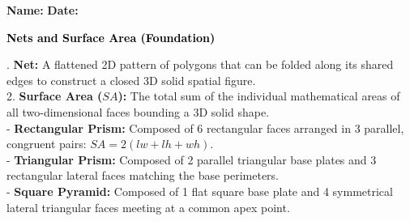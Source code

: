 \documentclass[12pt, letterpaper, fleqn]{article}
\renewcommand{\footrulewidth}{0.2pt}
\begin{document}
\pagestyle{fancy}
\fancyhf{}
\fancyfoot[C]{\thepage}
\renewcommand{\footrulewidth}{0.2pt}

\textbf{Name:} \underline{\hspace{5cm}} \hfill \textbf{Date:} \underline{\hspace{3cm}}\\

\begin{tcolorbox}[colback=black!10]
    \large\textcolor{black}{\textbf{Nets and Surface Area (Foundation)}}
\end{tcolorbox}

\vspace{2mm}
. \textbf{Net:} A flattened 2D pattern of polygons that can be folded along its shared edges to construct a closed 3D solid spatial figure.\\
2. \textbf{Surface Area ($SA$):} The total sum of the individual mathematical areas of all two-dimensional faces bounding a 3D solid shape.\\
- \textbf{Rectangular Prism:} Composed of 6 rectangular faces arranged in 3 parallel, congruent pairs: $SA = 2(lw + lh + wh)$.\\
- \textbf{Triangular Prism:} Composed of 2 parallel triangular base plates and 3 rectangular lateral faces matching the base perimeters.\\
- \textbf{Square Pyramid:} Composed of 1 flat square base plate and 4 symmetrical lateral triangular faces meeting at a common apex point.

\vspace{3mm}
\end{document}
